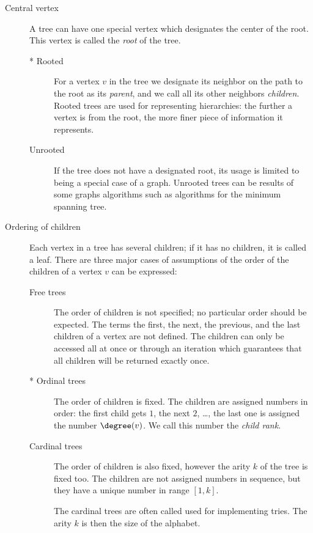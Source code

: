 \begin{description}
	\item[Central vertex]
	A tree can have one special vertex which designates the center of the root.
	This vertex is called the \emph{root} of the tree.
	
	\begin{description}
		\item[* Rooted]
		For a vertex $v$ in the tree we designate its neighbor on the path to the root as its \emph{parent}, and we call all its other neighbors \emph{children}.
		Rooted trees are used for representing hierarchies: the further a vertex is from the root, the more finer piece of information it represents.
		
		\item[Unrooted]
		If the tree does not have a designated root, its usage is limited to being a special case of a graph.
		Unrooted trees can be results of some graphs algorithms such as algorithms for the minimum spanning tree.
	\end{description}

	\item[Ordering of children]
	Each vertex in a tree has several children; if it has no children, it is called a leaf.
	There are three major cases of assumptions of the order of the children of a vertex $v$ can be expressed:
	\begin{description}
		\item[Free trees]
		The order of children is not specified; no particular order should be expected.
		The terms the first, the next, the previous, and the last children of a vertex are not defined.
		The children can only be accessed all at once or through an iteration which guarantees that all children will be returned exactly once.
		
		\item[* Ordinal trees]
		The order of children is fixed.
		The children are assigned numbers in order: the first child gets $1$, the next $2$, \dots, the last one is assigned the number $\degree(v)$.
		We call this number the \emph{child rank}.
		
		\item[Cardinal trees]
		The order of children is also fixed, however the arity $k$ of the tree is fixed too.
		The children are not assigned numbers in sequence, but they have a unique number in range $[1, k]$.
		
		The cardinal trees are often called used for implementing tries.
		The arity $k$ is then the size of the alphabet.
	\end{description}
	

\end{description}
